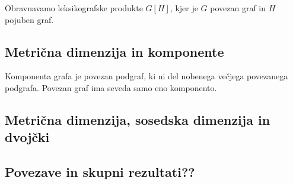 \documentclass[mat1, tisk]{fmfdelo}
\begin{document}
Obravnavamo leksikografske produkte $G[H]$, kjer je $G$ povezan graf in $H$ pojuben graf. 

\subsection{Metrična dimenzija in komponente}
Komponenta grafa je povezan podgraf, ki ni del nobenega večjega povezanega 
podgrafa. Povezan graf ima seveda samo eno komponento.


\subsection{Metrična dimenzija, sosedska dimenzija in dvojčki}

\subsection{Povezave in skupni rezultati??}



\end{document}
